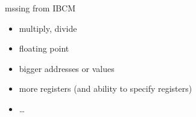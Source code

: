 \begin{frame}{mssing from IBCM}
\begin{itemize}
    \item multiply, divide
    \item floating point
    \item bigger addresses or values
    \item more registers (and ability to specify registers)
    \item \ldots
\end{itemize}
\end{frame}
